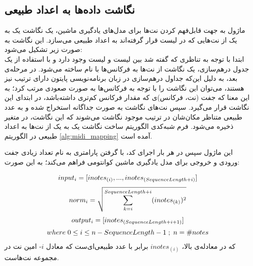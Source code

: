 \subsection{نگاشت داده‌ها به اعداد طبیعی}
ماژول 
به جهت قابل‌فهم کردن نت‌ها برای مدل‌های یادگیری ماشین، یک نگاشت یک به یک از نت‌هایی که در لیست
قرار گرفته‌اند به اعداد طبیعی می‌سازد. این نگاشت به صورت زیر تشکیل می‌شود: \\
ابتدا با توجه به تناظری که گفته شد بین لیست
و لیست
وجود دارد و با استفاده از یک جدول درهم‌سازی، یک نگاشت از نت‌ها به فرکانس‌ها با نام
ساخته می‌شود. در مرحله‌ی بعد، به دلیل این‌که جداول درهم‌سازی در زبان برنامه‌نویسی پایتون دارای ترتیب نیز هستند، می‌توان این نگاشت را با توجه به فرکانس‌ها به صورت صعودی مرتب کرد؛ به این معنا که جفت (نت، فرکانس)ی که مقدار فرکانس کم‌تری داشته‌باشد، در ابتدای این نگاشت قرار می‌گیرد. سپس نت‌های نگاشت
به صورت جداگانه استخراج شده و به عدد طبیعی متناظر مکان‌شان در ترتیب موجود نگاشت می‌شوند که این نگاشت، در متغیر
ذخیره می‌شود.
فرم شبه‌کدی الگوریتم ساخت نگاشت یک به یک از نت‌ها به اعداد طبیعی در الگوریتم
\ref{alg:midi_mapping}
آمده است.



این ماژول سپس در هر بار اجرای کد، با گرفتن پارامتری به نام
تعداد زیادی جفت ورودی و خروجی برای مدل یادگیری ماشین کوانتومی فراهم می‌کند؛ به این صورت:

\begin{equation}
    \begin{gathered}
    input_i = [inotes_{(i)}, ..., inotes_{(SequenceLength + i)}] \\[3pt]
    norm_i = \sqrt{\sum^{SequenceLength+i}_{k=i} (inotes_{(k)})^2 } \\[3pt]
    output_i = [inotes_{(SequenceLength + i + 1)}] \\[3pt]
    where \hspace{1mm} 0 \leq i \leq n - SequenceLength - 1 \hspace{1mm} ; \hspace{1mm} n = \#notes
    \end{gathered}
\end{equation}
که در معادله‌ی بالا،
$inotes_{(i)}$
برابر با عدد طبیعی‌ای‌ست که معادل
$i$-
امین نت در مجموعه نت‌هاست.
